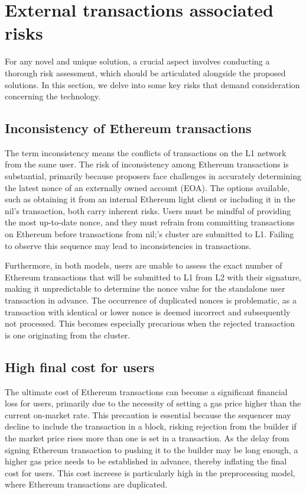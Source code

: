 \section{External transactions associated risks}

For any novel and unique solution, a crucial aspect involves conducting a thorough risk 
assessment, which should be articulated alongside the proposed solutions. In this section, we 
delve into some key risks that demand consideration concerning the technology.


\subsection{Inconsistency of Ethereum transactions}

The term inconsistency means the conflicts of transactions on the L1 network from the same user. 
The risk of inconsistency among Ethereum transactions is substantial, primarily because proposers 
face challenges in accurately determining the latest nonce of an externally owned account (EOA). 
The options available, such as obtaining it from an internal Ethereum light client or including 
it in the nil's transaction, both carry inherent risks. Users must be mindful of providing the 
most up-to-date nonce, and they must refrain from committing transactions on Ethereum before 
transactions from nil;'s cluster are submitted to L1. Failing to observe this sequence may lead 
to inconsistencies in transactions.

Furthermore, in both models, users are unable to assess the exact number of Ethereum 
transactions that will be submitted to L1 from L2 with their signature, making it unpredictable 
to determine the nonce value for the standalone user transaction in advance. The occurrence of 
duplicated nonces is problematic, as a transaction with identical or lower nonce is deemed 
incorrect and subsequently not processed. This becomes especially precarious when the rejected 
transaction is one originating from the cluster.


\subsection{High final cost for users}

The ultimate cost of Ethereum transactions can become a significant financial loss for users, 
primarily due to the necessity of setting a gas price higher than the current on-market rate. 
This precaution is essential because the sequencer may decline to include the transaction in a 
block, risking rejection from the builder if the market price rises more than one is set in 
a transaction. As the delay from signing Ethereum transaction to pushing it to the builder may 
be long enough, a higher gas price needs to be established in advance, thereby inflating the 
final cost for users. This cost increese is particularly high in the preprocessing model, where 
Ethereum transactions are duplicated.


